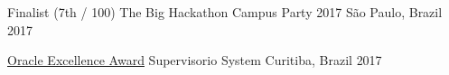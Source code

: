 



\begin{cvhonors}

  \cvhonor
    {Finalist (7th / 100) } %
    {The Big Hackathon Campus Party 2017} %
    {São Paulo, Brazil} %
    {2017} %
    
  \cvhonor
    {\href{https://www.linkedin.com/feed/update/activity:6329738492943310848}{Oracle Excellence Award}} %
    {Supervisorio System}%
    {Curitiba, Brazil} %
    {2017} %
    
    
\end{cvhonors}
